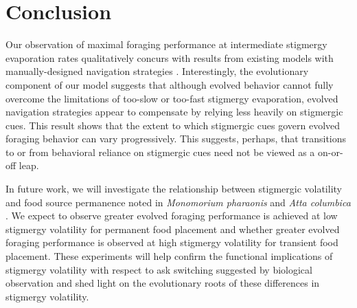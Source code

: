 \section{Conclusion}

Our observation of maximal foraging performance at intermediate stigmergy evaporation rates qualitatively concurs with results from existing models with manually-designed navigation strategies \cite{panait2004ant}.
Interestingly, the evolutionary component of our model suggests that although evolved behavior cannot fully overcome the limitations of too-slow or too-fast stigmergy evaporation, evolved navigation strategies appear to compensate by relying less heavily on stigmergic cues.
This result shows that the extent to which stigmergic cues govern evolved foraging behavior can vary progressively.
This suggests, perhaps, that transitions to or from behavioral reliance on stigmergic cues need not be viewed as a on-or-off leap.

In future work, we will investigate the relationship between stigmergic volatility and food source permanence noted in \textit{Monomorium pharaonis} and \textit{Atta columbica} \cite{jeanson_pheromone_2003, howard_costs_2001, robinson_decay_2008}.
We expect to observe greater evolved foraging performance is achieved at low stigmergy volatility for permanent food placement and whether greater evolved foraging performance is observed at high stigmergy volatility for transient food placement.
These experiments will help confirm the functional implications of stigmergy volatility with respect to ask switching suggested by biological observation and shed light on the evolutionary roots of these differences in stigmergy volatility.
